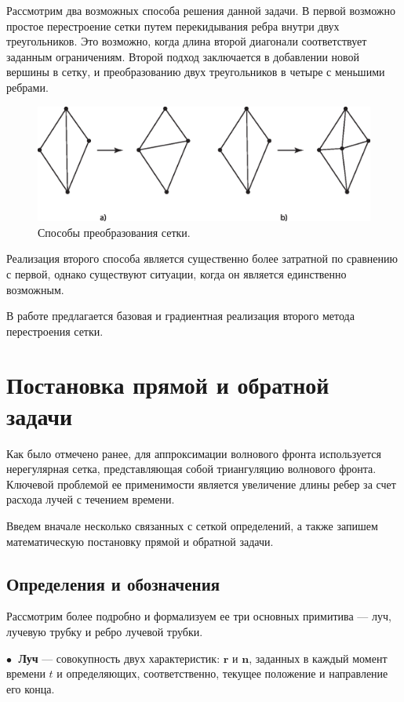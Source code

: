 \documentclass[12pt, cleqn, a4paper]{article}
\newcommand{\bfv}[1]{\mathbf{#1}}
\begin{document}
Рассмотрим два возможных способа решения данной задачи. В первой возможно простое перестроение сетки путем перекидывания ребра внутри двух треугольников. Это возможно, когда длина второй диагонали соответствует заданным ограничениям. Второй подход заключается в добавлении новой вершины в сетку, и преобразованию двух треугольников в четыре с меньшими ребрами.

\begin{figure}[H]
    \centering
    \includegraphics[width=0.8\linewidth]{transform_edge.eps}
    \caption{Способы преобразования сетки.}
\end{figure}

Реализация второго способа является существенно более затратной по сравнению с первой, однако существуют ситуации, когда он является единственно возможным.

В работе предлагается базовая и градиентная реализация второго метода перестроения сетки.

\newpage
\section{Постановка прямой и обратной задачи}
Как было отмечено ранее, для аппроксимации волнового фронта используется нерегулярная сетка, представляющая собой триангуляцию волнового фронта. Ключевой проблемой ее применимости является увеличение длины ребер за счет расхода лучей с течением времени. 

Введем вначале несколько связанных с сеткой определений, а также запишем математическую постановку прямой и обратной задачи.

\subsection{Определения и обозначения}
Рассмотрим более подробно и формализуем ее три основных примитива --- луч, лучевую трубку и ребро лучевой трубки.

$\bullet\;$ \textbf{Луч} --- совокупность двух характеристик: $\bfv{r}$ и $\bfv{n}$, заданных в каждый момент времени $t$ и определяющих, соответственно, текущее положение и направление его конца.
\end{document}
